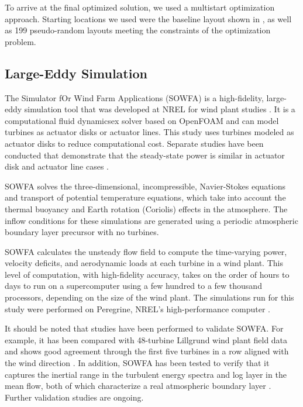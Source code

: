 \documentclass[conf]{new-aiaa}
\begin{document}
To arrive at the final optimized solution, we used a multistart optimization approach. Starting locations we used were the baseline layout shown in , as well as 199 pseudo-random layouts meeting the constraints of the optimization problem.

\subsection{Large-Eddy Simulation}

The Simulator fOr Wind Farm Applications (SOWFA) is a high-fidelity, large-eddy simulation tool that was developed at NREL for wind plant studies \cite{churchfieldnwtc,churchfield2012numerical,fleming2013sowfa}.  It is a computational fluid dynamicsex solver based on OpenFOAM \cite{jasak2007openfoam} and can model turbines as actuator disks or actuator lines.  This study uses turbines modeled as actuator disks to reduce computational cost.  Separate studies have been conducted that demonstrate that the steady-state power is similar in actuator disk and actuator line cases \cite{martinez2012comparison}.

SOWFA solves the three-dimensional, incompressible, Navier-Stokes equations and transport of potential temperature equations, which take into account the thermal buoyancy and Earth rotation (Coriolis) effects in the atmosphere.  The inflow conditions for these simulations are generated using a periodic atmospheric boundary layer precursor with no turbines.  

SOWFA calculates the unsteady flow field to compute the time-varying power, velocity deficits, and aerodynamic loads at each turbine in a wind plant.  This level of computation, with high-fidelity accuracy, takes on the order of hours to days to run on a supercomputer using a few hundred to a few thousand processors, depending on the size of the wind plant. The simulations run for this study were performed on Peregrine, NREL's high-performance computer \cite{regimbal2015peregrine}.

It should be noted that studies have been performed to validate SOWFA.  For example, it has been compared with 48-turbine Lillgrund wind plant field data and shows good agreement through the first five turbines in a row aligned with the wind direction \cite{churchfield2012large}.  In addition, SOWFA has been tested to verify that it captures the inertial range in the turbulent energy spectra and log layer in the mean flow, both of which characterize a real atmospheric boundary layer \cite{churchfield2012numerical}.  Further validation studies are ongoing.  
\end{document}
